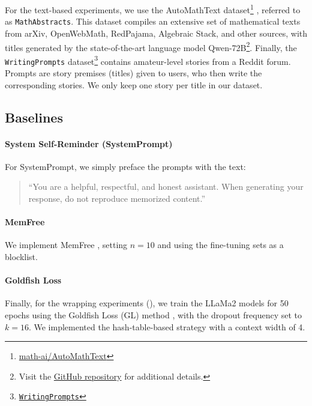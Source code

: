 For the text-based experiments, we use the AutoMathText dataset\footnote{\href{https://huggingface.co/datasets/math-ai/AutoMathText}{math-ai/AutoMathText}} \citep{zhang2024autonomous}, referred to as \texttt{MathAbstracts}. This dataset compiles an extensive set of mathematical texts from arXiv, OpenWebMath, RedPajama, Algebraic Stack, and other sources, with titles generated by the state-of-the-art language model Qwen-72B\footnote{Visit the \href{https://github.com/yifanzhang-pro/AutoMathText}{GitHub repository} for additional details.}. Finally, the \texttt{WritingPrompts} dataset\footnote{\href{https://huggingface.co/datasets/euclaise/writingprompts}{\texttt{WritingPrompts}}} \citep{fan2018hierarchical} contains amateur-level stories from a Reddit forum. Prompts are story premises (titles) given to users, who then write the corresponding stories. We only keep one story per title in our dataset.


\subsection{Baselines}
\label{app:baselines}

\paragraph{System Self-Reminder (SystemPrompt)}
For SystemPrompt, we simply preface the prompts with the text: 
\begin{quote}
    ``You are a helpful, respectful, and honest assistant. When generating your response, do not reproduce memorized content.''
\end{quote}

\paragraph{MemFree}
We implement MemFree \citep{ippolito2023preventing}, setting $n=10$ and using the fine-tuning sets as a blocklist.

\paragraph{Goldfish Loss}
Finally, for the wrapping experiments (), we train the LLaMa2 models for 50 epochs using the Goldfish Loss (GL) method \citep{hans2024like}, with the dropout frequency set to $k=16$. We implemented the hash-table-based strategy with a context width of 4.



